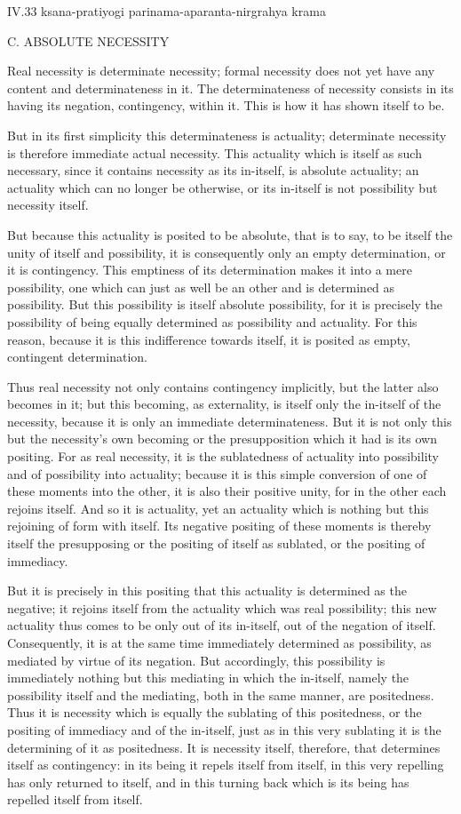 IV.33
ksana-pratiyogi parinama-aparanta-nirgrahya krama

C. ABSOLUTE NECESSITY

Real necessity is determinate necessity;
formal necessity does not yet have
any content and determinateness in it.
The determinateness of necessity consists in
its having its negation, contingency, within it.
This is how it has shown itself to be.

But in its first simplicity this determinateness is actuality;
determinate necessity is therefore immediate actual necessity.
This actuality which is itself as such necessary,
since it contains necessity as its in-itself,
is absolute actuality;
an actuality which can no longer be otherwise,
or its in-itself is not possibility but necessity itself.

But because this actuality is posited to be absolute,
that is to say, to be itself
the unity of itself and possibility,
it is consequently only an empty determination,
or it is contingency.
This emptiness of its determination makes it
into a mere possibility,
one which can just as well be an other
and is determined as possibility.
But this possibility is itself absolute possibility,
for it is precisely the possibility of being
equally determined as possibility and actuality.
For this reason, because it is this indifference towards itself,
it is posited as empty, contingent determination.

Thus real necessity not only contains contingency implicitly,
but the latter also becomes in it;
but this becoming, as externality,
is itself only the in-itself of the necessity,
because it is only an immediate determinateness.
But it is not only this but the necessity's own becoming
or the presupposition which it had is its own positing.
For as real necessity, it is the sublatedness
of actuality into possibility
and of possibility into actuality;
because it is this simple conversion of
one of these moments into the other,
it is also their positive unity,
for in the other each rejoins itself.
And so it is actuality, yet an actuality
which is nothing but this rejoining of form with itself.
Its negative positing of these moments is
thereby itself the presupposing
or the positing of itself as sublated,
or the positing of immediacy.

But it is precisely in this positing that
this actuality is determined as the negative;
it rejoins itself from the actuality which was real possibility;
this new actuality thus comes to be only out of its in-itself,
out of the negation of itself.
Consequently, it is at the same time
immediately determined as possibility,
as mediated by virtue of its negation.
But accordingly, this possibility is
immediately nothing but this mediating
in which the in-itself,
namely the possibility itself and the mediating,
both in the same manner, are positedness.
Thus it is necessity which is
equally the sublating of this positedness,
or the positing of immediacy and of the in-itself,
just as in this very sublating
it is the determining of it as positedness.
It is necessity itself, therefore,
that determines itself as contingency:
in its being it repels itself from itself,
in this very repelling has only returned to itself,
and in this turning back which is its being
has repelled itself from itself.


